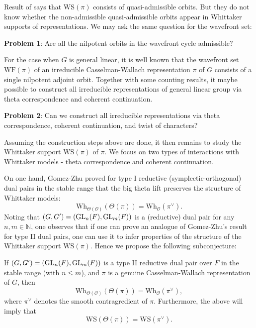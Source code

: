 Result of \cite{GGS21} says that $\mathrm{WS}(\pi)$ consists of quasi-admissible orbits. But they do not know whether the non-admissible quasi-admissible orbits appear in Whittaker supports of representations. We may ask the same question for the wavefront set:

\textbf{Problem 1}: Are all the nilpotent orbits in the wavefront cycle admissible?

\medskip

For the case when $G$ is general linear, it is well known that the wavefront set $\mathrm{WF}(\pi)$ of an irreducible Casselman-Wallach representation $\pi$ of $G$ consists of a single nilpotent adjoint orbit. Together with some counting results, it maybe possible to construct all irreducible representations of general linear group via theta correspondence and coherent continuation.

\textbf{Problem 2}: Can we construct all irreducible representations via theta correspondence, coherent continuation, and twist of characters?

Assuming the construction steps above are done, it then remains to study the Whittaker support $\mathrm{WS}(\pi)$ of $\pi$. We focus on two types of interactions with Whittaker models - theta correspondence and coherent continuation.



On one hand, Gomez-Zhu \cite{GZ14} proved for type I reductive (symplectic-orthogonal) dual pairs in the stable range that the big theta lift preserves the structure of Whittaker models:
\[\mathrm{Wh}_{\Theta(\mathcal{O})}\left(\Theta(\pi)\right)=\mathrm{Wh}_\mathcal{O}(\pi^\vee).\]
Noting that $(G,G')=(\operatorname{GL}_n(F),\operatorname{GL}_m(F))$ is a (reductive) dual pair for any $n,m\in\mathbb{N}$, one observes that if one can prove an analogue of Gomez-Zhu's result for type II dual pairs, one can use it to infer properties of the structure of the Whittaker support $\mathrm{WS}(\pi)$. Hence we propose the following subconjecture:
\begin{conj}
    If $(G,G')=(\operatorname{GL}_n(F),\operatorname{GL}_m(F))$ is a type II reductive dual pair over $F$ in the stable range (with $n\leq m$), and $\pi$ is a genuine Casselman-Wallach representation of $G$, then
    \[\mathrm{Wh}_{\Theta(\mathcal{O})}\left(\Theta(\pi)\right)=\mathrm{Wh}_\mathcal{O}(\pi^\vee),\]
    where $\pi^\vee$ denotes the smooth contragredient of $\pi$. Furthermore, the above will imply that
    \[\mathrm{WS}\left(\Theta(\pi)\right)=\mathrm{WS}(\pi^\vee).\]
\end{conj}


